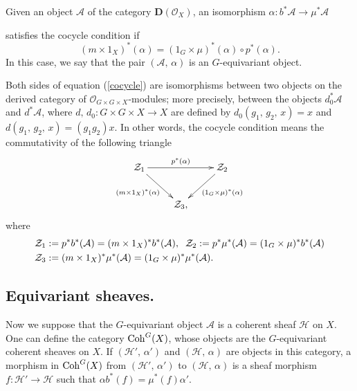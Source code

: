 \documentclass[xypic,amscd,syntonly,amssymb,verbatim,12pt]{amsart}
\theoremstyle{plain}
\theoremstyle{definition}
\theoremstyle{remark}
\numberwithin{equation}{section}
\begin{document}
Given an object  ${\mathcal A}$  of the category ${\mathbf
D}({\mathcal O}_X)$, an isomorphism $\alpha:b^*{\mathcal
A}\to\mu^*{\mathcal A}$
 
 satisfies the cocycle condition if
\begin{equation}\label{cocycle}
(m\times 1_X)^*(\alpha)=(1_G\times\mu)^*(\alpha)\circ p^*(\alpha).
\end{equation}
In this case, we say that the pair $({\mathcal A},\,\alpha)$ is an
$G$-equivariant object.


Both sides of equation (\ref{cocycle}) are isomorphisms between
two objects on the derived category of ${\mathcal O}_{G\times
G\times X}$-modules;
 more precisely, between the objects $d_0^*{\mathcal A}$ and $d^*{\mathcal A}$, where
  $d,\,d_0: G\times G\times X \to X$ are defined by
$d_0(g_1,\,g_2,\,x)=x$ and $d(g_1,\,g_2,\,x)=(g_1g_2)x.$ In other
words, the cocycle condition means  the commutativity of the
following triangle
 \begin{equation}\label{triangleZ}
  \xymatrix{
 {\mathcal Z}_1\ar[dr]_{(m\times 1_X)^*(\alpha)}\ar[rr]^{p^*(\alpha)} &&{\mathcal Z}_{2}\ar[dl]^{(1_G\times \mu)^*(\alpha)}\\
 & {\mathcal Z}_{3}, }
  \end{equation}
where
$$\begin{aligned}\notag
&{\mathcal Z}_1:=p^*b^*({\mathcal A})=(m\times 1_X)^*b^*({\mathcal A}),\;\;{\mathcal Z}_2:=p^*\mu^*({\mathcal A})=(1_G\times\mu)^*b^*({\mathcal A}) \\ &{\mathcal Z}_3:=(m\times 1_X)^*\mu^*({\mathcal A})=(1_G\times\mu)^*\mu^*({\mathcal A}).
\end{aligned}$$
 




\smallskip
\subsection{Equivariant sheaves.}\label{SubsectEqSh}
Now we suppose that the $G$-equivariant object ${\mathcal A}$
is a coherent sheaf
${\mathcal H}$ on $X$. One can define the category ${\rm Coh}^G(X)$, whose objects are the $G$-equivariant coherent sheaves on $X$. If $({\mathcal H}',\,\alpha')$ and $({\mathcal H},\,\alpha)$ are objects in this category, a morphism in ${\rm Coh}^G(X)$ from $({\mathcal H}',\,\alpha')$ to $({\mathcal H},\,\alpha)$ is a sheaf morphism $f:{\mathcal H}'\to{\mathcal H}$ such that $\alpha b^*(f)=\mu^*(f)\alpha'$.
\end{document}
